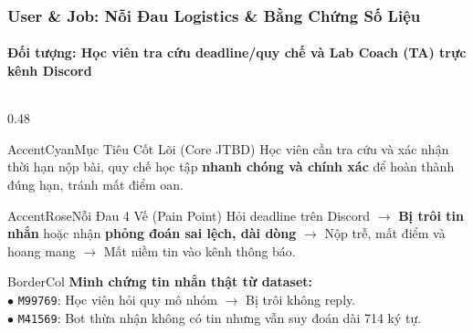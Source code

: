 \documentclass[aspectratio=169,10pt]{beamer}
\begin{document}
\begin{frame}
  \frametitle{User \& Job: Nỗi Đau Logistics \& Bằng Chứng Số Liệu}
  \framesubtitle{Đối tượng: Học viên tra cứu deadline/quy chế và Lab Coach (TA) trực kênh Discord}

  \begin{columns}[T]
    \begin{column}{0.48\textwidth}
      \begin{calloutbox}{AccentCyan}{Mục Tiêu Cốt Lõi (Core JTBD)}
        \footnotesize
        Học viên cần tra cứu và xác nhận thời hạn nộp bài, quy chế học tập \textbf{nhanh chóng và chính xác} để hoàn thành đúng hạn, tránh mất điểm oan.
      \end{calloutbox}
      \vspace{0.2cm}
      \begin{calloutbox}{AccentRose}{Nỗi Đau 4 Vế (Pain Point)}
        \footnotesize
        Hỏi deadline trên Discord $\rightarrow$ \textbf{Bị trôi tin nhắn} hoặc nhận \textbf{phỏng đoán sai lệch, dài dòng} $\rightarrow$ Nộp trễ, mất điểm và hoang mang $\rightarrow$ Mất niềm tin vào kênh thông báo.
      \end{calloutbox}
      \vspace{0.2cm}
      \begin{glassbox}{BorderCol}
        \tiny \color{TextMuted}
        \textbf{Minh chứng tin nhắn thật từ dataset:}\\
        $\bullet$ \texttt{M99769}: Học viên hỏi quy mô nhóm $\rightarrow$ Bị trôi không reply.\\
        $\bullet$ \texttt{M41569}: Bot thừa nhận không có tin nhưng vẫn suy đoán dài 714 ký tự.
      \end{glassbox}
    \end{column}


\end{columns}
\end{frame}
\end{document}
